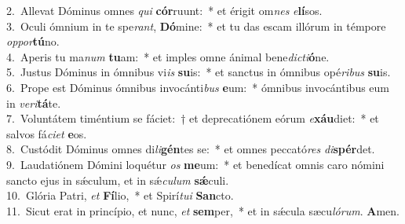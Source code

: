 {2.~}Allevat Dóminus omnes \textit{qui} \textbf{cór}ruunt:~* et érigit om\textit{nes} \textit{e}\textbf{lí}sos.\\
{3.~}Oculi ómnium in te spe\textit{rant}, \textbf{Dó}mine:~* et tu das escam illórum in témpore \textit{op}\textit{por}\textbf{tú}no.\\
{4.~}Aperis tu ma\textit{num} \textbf{tu}am:~* et imples omne ánimal bene\textit{di}\textit{cti}\textbf{ó}ne.\\
{5.~}Justus Dóminus in ómnibus vi\textit{is} \textbf{su}is:~* et sanctus in ómnibus opé\textit{ri}\textit{bus} \textbf{su}is.\\
{6.~}Prope est Dóminus ómnibus invocánti\textit{bus} \textbf{e}um:~* ómnibus invocántibus eum in \textit{ve}\textit{ri}\textbf{tá}te.\\
{7.~}Voluntátem timéntium se fáciet:~† et deprecatiónem eórum \textit{e}\textbf{xáu}diet:~* et salvos fá\textit{ci}\textit{et} \textbf{e}os.\\
{8.~}Custódit Dóminus omnes di\textit{li}\textbf{gén}tes se:~* et omnes peccató\textit{res} \textit{di}\textbf{spér}det.\\
{9.~}Laudatiónem Dómini loquétur \textit{os} \textbf{me}um:~* et benedícat omnis caro nómini sancto ejus in sǽculum, et in sǽ\textit{cu}\textit{lum} \textbf{sǽ}culi.\\
{10.~}Glória Patri, \textit{et} \textbf{Fí}lio,~* et Spirí\textit{tu}\textit{i} \textbf{San}cto.\\
{11.~}Sicut erat in princípio, et nunc, \textit{et} \textbf{sem}per,~* et in sǽcula sæcu\textit{ló}\textit{rum}. \textbf{A}men.\\

